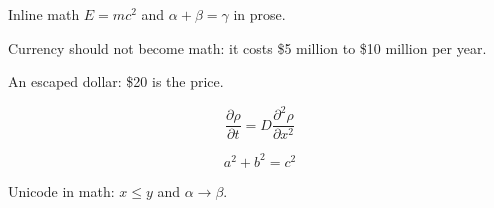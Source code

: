 
Inline math $E = mc^2$ and $\alpha + \beta = \gamma$ in prose.

Currency should not become math: it costs \$5 million to \$10 million per year.

An escaped dollar: \$20 is the price.

\[
\frac{\partial \rho}{\partial t} = D \frac{\partial^2 \rho}{\partial x^2}
\]

\[
a^2 + b^2 = c^2
\]

Unicode in math: $x \le y$ and $\alpha \rightarrow \beta$.
